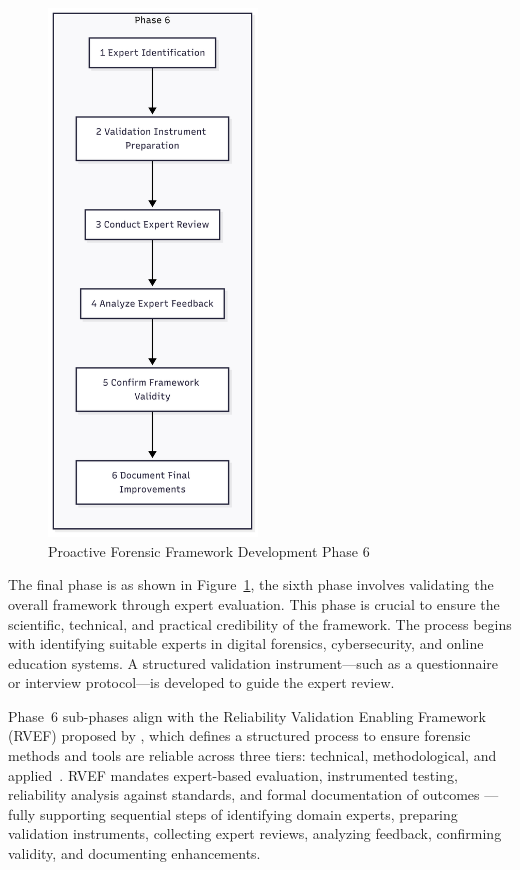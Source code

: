 \begin{figure}[H]
    \centering
    \includegraphics[height=14cm]{figure/framework-development-phase-6.png}
    \caption{Proactive Forensic Framework Development Phase 6}
    \label{fig:framework-development-phase-6}
\end{figure}

The final phase is as shown in Figure~\ref{fig:framework-development-phase-6}, the sixth phase involves validating the overall framework through expert evaluation. This phase is crucial to ensure the scientific, technical, and practical credibility of the framework. The process begins with identifying suitable experts in digital forensics, cybersecurity, and online education systems. A structured validation instrument—such as a questionnaire or interview protocol—is developed to guide the expert review.

Phase~6 sub-phases align with the Reliability Validation Enabling Framework (RVEF) proposed by \citet{stoykova2023rvef}, which defines a structured process to ensure forensic methods and tools are reliable across three tiers: technical, methodological, and applied~\cite{stoykova2023rvef}. RVEF mandates expert-based evaluation, instrumented testing, reliability analysis against standards, and formal documentation of outcomes — fully supporting sequential steps of identifying domain experts, preparing validation instruments, collecting expert reviews, analyzing feedback, confirming validity, and documenting enhancements.


